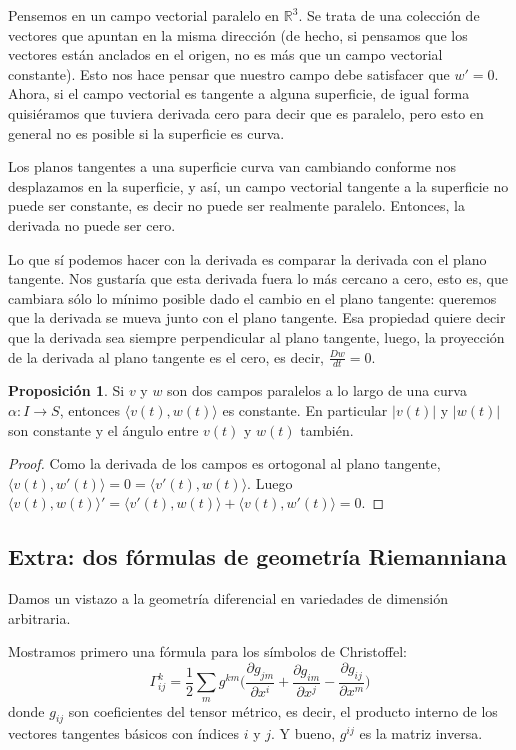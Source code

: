 \documentclass[spanish]{book}
\theoremstyle{definition}
\newtheorem*{prop}{Proposición}
\begin{document}
Pensemos en un campo vectorial paralelo en $\mathbb R^3$. Se trata de una colección de vectores que apuntan en la misma dirección (de hecho, si pensamos que los vectores están anclados en el origen, no es más que un campo vectorial constante). Esto nos hace pensar que nuestro campo debe satisfacer que $w'=0$. Ahora, si el campo vectorial es tangente a alguna superficie, de igual forma quisiéramos que tuviera derivada cero para decir que es paralelo, pero esto en general no es posible si la superficie es curva.

Los planos tangentes a una superficie curva van cambiando conforme nos desplazamos en la superficie, y así, un campo vectorial tangente a la superficie no puede ser constante, es decir no puede ser realmente paralelo. Entonces, la derivada no puede ser cero.

Lo que sí podemos hacer con la derivada es comparar la derivada con el plano tangente. Nos gustaría que esta derivada fuera lo más cercano a cero, esto es, que cambiara sólo lo mínimo posible dado el cambio en el plano tangente: queremos que la derivada se mueva junto con el plano tangente. Esa propiedad quiere decir que la derivada sea siempre perpendicular al plano tangente, luego, la proyección de la derivada al plano tangente es el cero, es decir, $\frac{Dw}{dt}=0$.
\begin{prop}
	Si $v$ y $w$ son dos campos paralelos a lo largo de una curva $\alpha:I\to S$, entonces $\langle v(t),w(t)\rangle$ es constante. En particular $|v(t)|$ y $|w(t)|$ son constante y el ángulo entre $v(t)$ y $w(t)$ también.
\end{prop}
\begin{proof}
	Como la derivada de los campos es ortogonal al plano tangente, $\langle v(t),w'(t)\rangle=0=\langle v'(t),w(t)\rangle$. Luego $\langle v(t),w(t)\rangle'=\langle v'(t),w(t)\rangle+\langle v(t),w'(t)\rangle=0.$
\end{proof}
\subsection{Extra: dos fórmulas de geometría Riemanniana}
Damos un vistazo a la geometría diferencial en variedades de dimensión arbitraria.

Mostramos primero una fórmula para los símbolos de Christoffel:
\[\Gamma^k_{ij}=\frac{1}{2}\sum_m g^{km}\Big(\frac{\partial g_{jm}}{\partial x^i}+\frac{\partial g_{im}}{\partial x^j}-\frac{\partial g_{ij}}{\partial x^m}\Big)\]
donde $g_{ij}$ son coeficientes del tensor métrico, es decir, el producto interno de los vectores tangentes básicos con índices $i$ y $j$. Y bueno, $g^{ij}$ es la matriz inversa.
\end{document}
